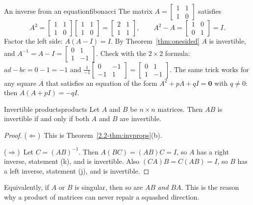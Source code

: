 \documentclass[11pt]{article}
\begin{document}
\begin{exmp}{An inverse from an equation}{fibonacci}
The matrix $A=\begin{bmatrix}1&1\\1&0\end{bmatrix}$ satisfies
\[
A^2=\begin{bmatrix}1&1\\1&0\end{bmatrix}\begin{bmatrix}1&1\\1&0\end{bmatrix}=\begin{bmatrix}2&1\\1&1\end{bmatrix},\qquad A^2-A=\begin{bmatrix}1&0\\0&1\end{bmatrix}=I.
\]
Factor the left side: $A(A-I)=I$. By Theorem~\ref{thm:onesided} $A$ is invertible, and $A^{-1}=A-I=\begin{bmatrix}0&1\\1&-1\end{bmatrix}$. Check with the $2\times2$ formula: $ad-bc=0-1=-1$ and $\frac1{-1}\begin{bmatrix}0&-1\\-1&1\end{bmatrix}=\begin{bmatrix}0&1\\1&-1\end{bmatrix}$. The same trick works for any square $A$ that satisfies an equation of the form $A^2+pA+qI=\mathbf{0}$ with $q\neq0$: then $A(A+pI)=-qI$.
\end{exmp}

\begin{thm}{Invertible products}{products}
Let $A$ and $B$ be $n\times n$ matrices. Then $AB$ is invertible if and only if both $A$ and $B$ are invertible.
\end{thm}

\begin{proof}
($\Leftarrow$)~This is Theorem~\ref{2.2-thm:invprops}(b).

($\Rightarrow$)~Let $C=(AB)^{-1}$. Then $A(BC)=(AB)C=I$, so $A$ has a right inverse, statement (k), and is invertible. Also $(CA)B=C(AB)=I$, so $B$ has a left inverse, statement (j), and is invertible.
\end{proof}

Equivalently, if $A$ or $B$ is singular, then so are $AB$ \emph{and} $BA$. This is the reason why a product of matrices can never repair a squashed direction.
\end{document}

